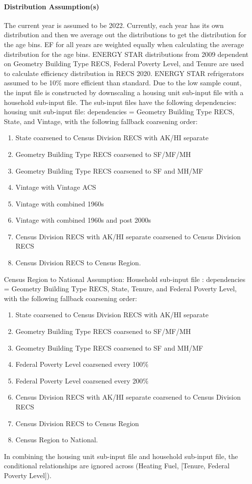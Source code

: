 \paragraph{Distribution Assumption(s)}
The current year is assumed to be 2022. 
Currently, each year has its own distribution and then we average out the distributions to get the distribution for the age bins. EF for all years are weighted equally when calculating the average distribution for the age bins. ENERGY STAR distributions from 2009 dependent on Geometry Building Type RECS, Federal Poverty Level, and Tenure are used to calculate efficiency distribution in RECS 2020. ENERGY STAR refrigerators assumed to be 10\% more efficient than standard. Due to the low sample count, the input file is constructed by downscaling a housing unit sub-input file with a household sub-input file. The sub-input files have the following dependencies: housing unit sub-input file: dependencies = Geometry Building Type RECS, State, and Vintage, with the following fallback coarsening order: 
\begin{enumerate}
    \item  State coarsened to Census Division RECS with AK/HI separate 
    \item Geometry Building Type RECS coarsened to SF/MF/MH 
\item Geometry Building Type RECS coarsened to SF and MH/MF 
\item Vintage with Vintage ACS 
\item Vintage with combined 1960s 
\item Vintage with combined 1960s and post 2000s 
\item Census Division RECS with AK/HI separate coarsened to Census Division RECS
\item Census Division RECS to Census Region.
\end{enumerate}
Census Region to National Assumption: Household sub-input file : dependencies = Geometry Building Type RECS, State, Tenure, and Federal Poverty Level, with the following fallback coarsening order:
\begin{enumerate}
\item State coarsened to Census Division RECS with AK/HI separate
\item Geometry Building Type RECS coarsened to SF/MF/MH 
\item  Geometry Building Type RECS coarsened to SF and MH/MF 
\item  Federal Poverty Level coarsened every 100\% 
\item  Federal Poverty Level coarsened every 200\% 
\item Census Division RECS with AK/HI separate coarsened to Census Division RECS 
\item Census Division RECS to Census Region 
\item Census Region to National. 

\end{enumerate}
In combining the housing unit sub-input file and household sub-input file, the conditional relationships are ignored across (Heating Fuel, [Tenure, Federal Poverty Level]).

